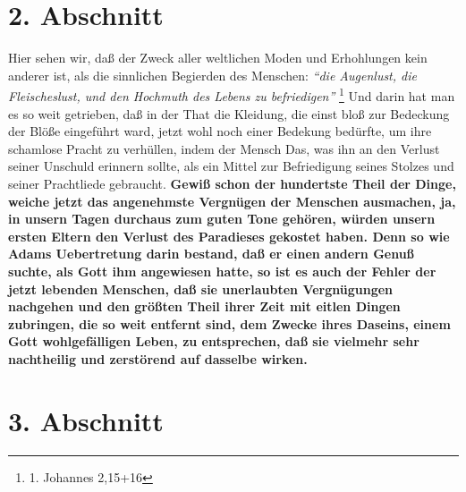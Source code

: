 \section{2. Abschnitt} \label{kap17_ab2}

Hier sehen wir, daß der Zweck aller weltlichen Moden und Erhohlungen kein
anderer ist, als die sinnlichen Begierden des Menschen:
\textit{"`die Augenlust, die
Fleischeslust, und den Hochmuth des Lebens zu befriedigen"'}
\footnote{1. Johannes 2,15+16}
Und darin hat man es so weit getrieben, daß in der That die Kleidung, die
einst bloß zur Bedeckung der Blöße eingeführt ward, jetzt wohl noch einer
Bedekung bedürfte, um ihre schamlose Pracht zu verhüllen, indem der Mensch Das,
was ihn an den Verlust seiner Unschuld erinnern sollte, als ein Mittel zur
Befriedigung seines Stolzes und seiner Prachtliede gebraucht.
\label{ref:17_02_adam_und_eva}
\textbf{Gewiß schon der
hundertste Theil der Dinge, weiche jetzt das angenehmste Vergnügen der Menschen
ausmachen, ja, in unsern Tagen durchaus zum guten Tone gehören, würden unsern
ersten Eltern den Verlust des Paradieses gekostet haben. Denn so wie
Adams
Uebertretung darin bestand, daß er einen andern Genuß suchte, als Gott ihm
angewiesen hatte, so ist es auch der Fehler der jetzt lebenden Menschen, daß sie
unerlaubten Vergnügungen nachgehen und den größten Theil ihrer Zeit mit eitlen
Dingen zubringen, die so weit entfernt sind, dem Zwecke ihres Daseins, einem
Gott wohlgefälligen Leben, zu entsprechen, daß sie vielmehr sehr nachtheilig und
zerstörend auf dasselbe wirken.}

\section{3. Abschnitt} \label{kap17_ab3}

